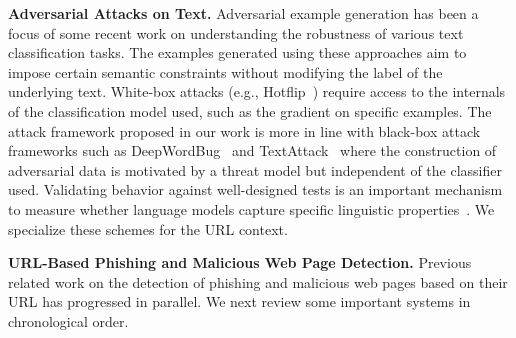 \noindent \textbf{Adversarial Attacks on Text.}
Adversarial example generation has been a focus of some recent work on understanding the robustness of various text classification tasks.
The examples generated using these approaches aim to impose certain semantic constraints without modifying the label of the underlying text.
White-box attacks (e.g., Hotflip~\citep{ebrahimi2018hotflip}) require access to the internals of the classification model used, such as the gradient on specific examples.
The attack framework proposed in our work is more in line with  black-box attack frameworks such as DeepWordBug~\citep{ji2018deepwordbug} and TextAttack~\citep{morris2020textattack} where the construction of adversarial data is motivated by a threat model but independent of the classifier used.
Validating behavior against well-designed tests is an important mechanism to measure whether language models capture specific linguistic properties~\citep{ribeiro2020beyond}.
We specialize these schemes for the URL context.


\noindent\textbf{URL-Based Phishing and Malicious Web Page Detection.}
%
Previous related work on the detection of phishing and malicious web pages based on their URL has progressed in parallel. 
We next review some important systems in chronological order.

